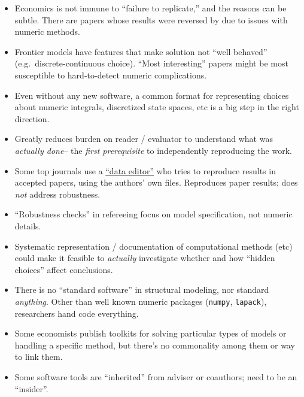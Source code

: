 \documentclass[12pt,pdftex,letterpaper]{article}
\begin{document}
\begin{itemize}
	\item Economics is not immune to ``failure to replicate,'' and the reasons can be subtle. There are papers whose results were reversed by due to issues with numeric methods.
	
	\item Frontier models have features that make solution not ``well behaved'' (e.g.\ discrete-continuous choice). ``Most interesting'' papers might be most susceptible to hard-to-detect numeric complications.
	
	\item Even without any new software, a common format for representing choices about numeric integrals, discretized state spaces, etc is a big step in the right direction.
	
	\item Greatly reduces burden on reader / evaluator to understand what was \textit{actually done}-- the \textit{first prerequisite} to independently reproducing the work.
	
	\item Some top journals use a \href{https://www.econometricsociety.org/publications/es-data-editor-website}{``data editor''} who tries to reproduce results in accepted papers, using the authors' own files. Reproduces paper results; does \textit{not} address robustness.
	
	\item ``Robustness checks'' in refereeing focus on model specification, not numeric details.
	
	\item Systematic representation / documentation of computational methods (etc) could make it feasible to \textit{actually} investigate whether and how ``hidden choices'' affect conclusions.
	
	\item There is no ``standard software'' in structural modeling, nor standard \textit{anything}. Other than well known numeric packages (\texttt{numpy}, \texttt{lapack}), researchers hand code everything.
	
	\item Some economists publish toolkits for solving particular types of models or handling a specific method, but there's no commonality among them or way to link them.
	
	\item Some software tools are ``inherited'' from adviser or coauthors; need to be an ``insider''.
	

\end{itemize}
\end{document}
